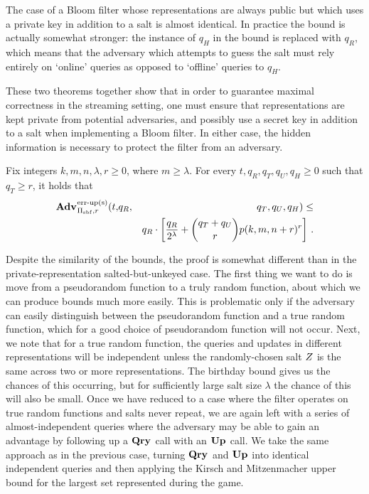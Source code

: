 The case of a Bloom filter whose representations are always public but which uses a private key in addition to a salt is almost identical. In practice the bound is actually somewhat stronger: the instance of $q_H$ in the bound is replaced with $q_R$, which means that the adversary which attempts to guess the salt must rely entirely on `online' queries as opposed to `offline' queries to $q_H$.

These two theorems together show that in order to guarantee maximal correctness in the streaming setting, one must ensure that representations are kept private from potential adversaries, and possibly use a secret key in addition to a salt when implementing a Bloom filter. In either case, the hidden information is necessary to protect the filter from an adversary.

\begin{theorem}\label{thm:bf-key-bound}
Fix integers $k, m, n, \lambda, r\geq 0$, where $m \geq \lambda$.
  For every $t, q_R, q_T, q_U, q_H \geq 0$ such that $q_T \geq r$, it holds that
  \begin{eqnarray*}
    \Adv{\erreps}_{\struct_\saltybloom,r}(t,&q_R,& q_T, q_U, q_H) \leq \\ && q_R \cdot
     \left[
      \frac{q_R}{2^\lambda} +
      {\dbinom{q_T+q_U}{r}} p(k, m, n+r)^r
    \right] \,.
  \end{eqnarray*}
\end{theorem}

Despite the similarity of the bounds, the proof is somewhat different than in the private-representation salted-but-unkeyed case. The first thing we want to do is move from a pseudorandom function to a truly random function, about which we can produce bounds much more easily. This is problematic only if the adversary can easily distinguish between the pseudorandom function and a true random function, which for a good choice of pseudorandom function will not occur. Next, we note that for a true random function, the queries and updates in different representations will be independent unless the randomly-chosen salt $Z$ is the same across two or more representations. The birthday bound gives us the chances of this occurring, but for sufficiently large salt size $\lambda$ the chance of this will also be small. Once we have reduced to a case where the filter operates on true random functions and salts never repeat, we are again left with a series of almost-independent queries where the adversary may be able to gain an advantage by following up a $\mathbf{Qry}\hspace{0.5pt}$ call with an $\mathbf{Up}\hspace{0.5pt}$ call. We take the same approach as in the previous case, turning $\mathbf{Qry}\hspace{0.5pt}$ and $\mathbf{Up}\hspace{0.5pt}$ into identical independent queries and then applying the Kirsch and Mitzenmacher upper bound for the largest set represented during the game.

